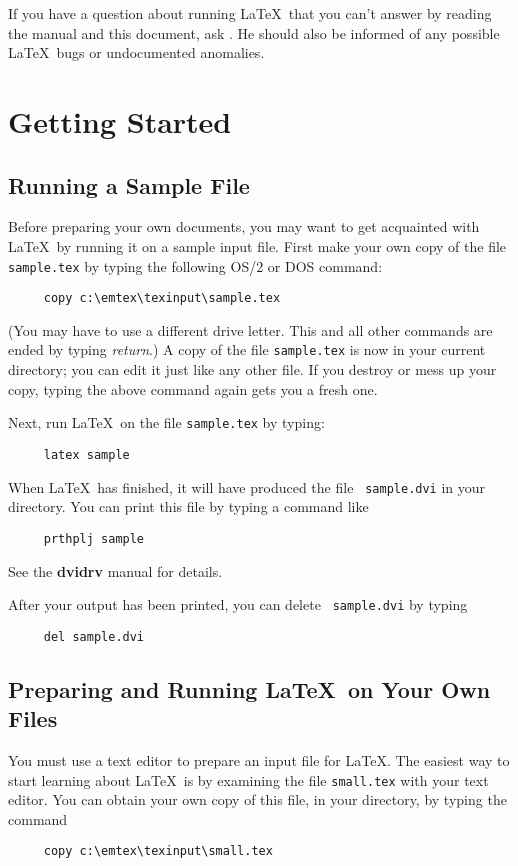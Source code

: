 If you have a question about running \LaTeX\
that you can't answer by reading the manual and
this document, ask \contact.  He should also be informed of any
possible \LaTeX\ bugs or undocumented anomalies.
 
 
\section{Getting Started}
 
\subsection{Running a Sample File} \label{sec:sample}
 
Before preparing your own documents, you may want to get acquainted
with \LaTeX\ by running it on a sample input file.  First make your own
copy of the file \mbox{\tt sample.tex} by typing the following
OS/2 or DOS command:
\begin{verbatim}
     copy c:\emtex\texinput\sample.tex
\end{verbatim}
(You may have to use a different drive letter. This and all other
commands are ended by typing {\em return}.)
A copy of the file \mbox{\tt sample.tex} is now in your current
directory; you can edit it just like any other file.  If you destroy or
mess up your copy, typing the above command again gets you a fresh
one.
 
Next, run \LaTeX\ on the file \mbox{\tt sample.tex} by typing:
\begin{verbatim}
     latex sample
\end{verbatim}
When \LaTeX\ has finished, it will have produced the file \mbox{\tt
sample.dvi} in your directory.  You can print this file by typing a
command like
\begin{verbatim}
     prthplj sample
\end{verbatim}
See the {\bf dvidrv} manual for details.
 
After your output has been printed, you can delete \mbox{\tt
sample.dvi} by typing
\begin{verbatim}
     del sample.dvi
\end{verbatim}
 
\subsection{Preparing and Running \LaTeX\ on Your Own Files}
 
You must use a text editor to prepare an input file for \LaTeX. The
easiest way to start learning about \LaTeX\ is by 
examining the file \mbox{\tt small.tex} with your text editor.
You can obtain your own copy of this file, in your directory,
by typing the command
\begin{verbatim}
     copy c:\emtex\texinput\small.tex
\end{verbatim}
 
